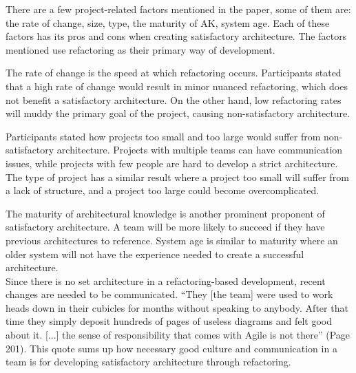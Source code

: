\documentclass[12pt]{article}
\newcommand\tab[1][1cm]{\hspace*{#1}}
\begin{document}
\tab There are a few project-related factors mentioned in the paper, some of 
them are: the rate of change, size, type, the maturity of AK, system age. 
Each of these factors has its pros and cons when creating satisfactory 
architecture.  The factors mentioned use refactoring as their primary way of
development. 

\tab The rate of change is the speed at which refactoring occurs. Participants 
stated that a high rate of change would result in minor nuanced refactoring, 
which does not benefit a satisfactory architecture.  On the other hand, low 
refactoring rates will muddy the primary goal of the project, causing 
non-satisfactory architecture. 

\tab Participants stated how projects too small and too large would suffer from
non-satisfactory architecture.  Projects with multiple teams can have 
communication issues, while projects with few people are hard to develop a
strict architecture.  The type of project has a similar result where a 
project too small will suffer from a lack of structure, and a project too 
large could become overcomplicated. 

\tab The maturity of architectural knowledge is another prominent proponent of 
satisfactory architecture. A team will be more likely to succeed if they have 
previous architectures to reference. System age is similar to maturity where 
an older system will not have the experience needed to create a successful 
architecture.\\

\tab Since there is no set architecture in a refactoring-based development, 
recent changes are needed to be communicated. “They [the team] were used to 
work heads down in their cubicles for months without speaking to anybody. 
After that time they simply deposit hundreds of pages of useless diagrams and 
felt good about it.  [...]  the sense of responsibility that comes with Agile 
is not there” (Page 201). This quote sums up how necessary good culture and 
communication in a team is for developing satisfactory architecture through 
refactoring. 
\end{document}
